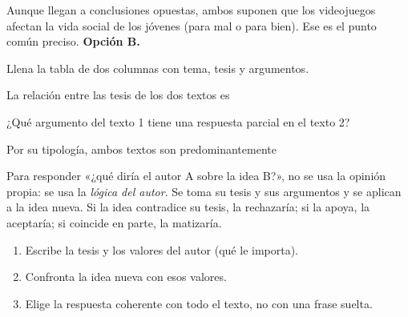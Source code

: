 \begin{retoresuelto}
Aunque llegan a conclusiones opuestas, ambos suponen que los videojuegos afectan la vida social de los jóvenes (para mal o
para bien). Ese es el punto común preciso. \textbf{Opción B.}
\end{retoresuelto}

\taller
{}
\begin{ejercicios}
\item Llena la tabla de dos columnas con tema, tesis y argumentos. 
\end{ejercicios}
\begin{ejercicios}
\item La relación entre las tesis de los dos textos es
\item ¿Qué argumento del texto 1 tiene una respuesta parcial en el texto 2?
\item Por su tipología, ambos textos son predominantemente
\end{ejercicios}

\bitacora


Para responder «¿qué diría el autor A sobre la idea B?», no se usa la opinión propia: se usa la \emph{lógica del autor}.
Se toma su tesis y sus argumentos y se aplican a la idea nueva. Si la idea contradice su tesis, la rechazaría; si la
apoya, la aceptaría; si coincide en parte, la matizaría.

\begin{regla}
\begin{enumerate}
  \item Escribe la tesis y los valores del autor (qué le importa).
  \item Confronta la idea nueva con esos valores.
  \item Elige la respuesta coherente con todo el texto, no con una frase suelta.
\end{enumerate}
\end{regla}

